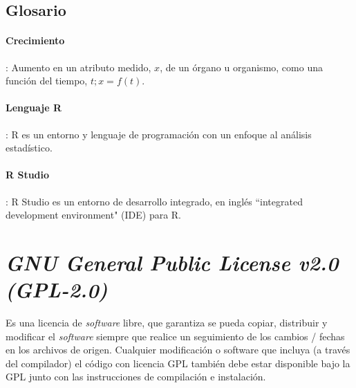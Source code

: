 \subsection{Glosario}

\paragraph{Crecimiento}: Aumento en un atributo medido, $x$, de un \'organo u organismo, como una funci\'on del tiempo, $t;x = f (t)$.
\paragraph{Lenguaje R}: R es un entorno y lenguaje de programaci\'on con un enfoque al an\'alisis estad\'istico.
\paragraph{R Studio }: R Studio es un entorno de desarrollo integrado, en ingl\'es ``integrated development environment" (IDE) para R.


\section{\textit{GNU General Public License v2.0 (GPL-2.0) }}

	Es una licencia de \textit{software} libre, que garantiza se pueda copiar, distribuir y modificar el \textit{software} siempre que realice un seguimiento de los cambios / fechas en los archivos de origen. Cualquier modificación o software que incluya (a trav\'es del compilador) el código con licencia GPL también debe estar disponible bajo la GPL junto con las instrucciones de compilación e instalación.